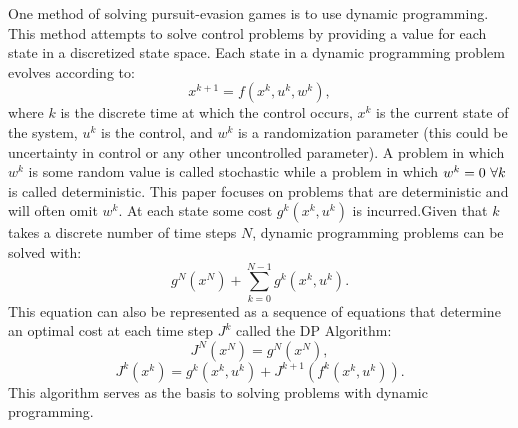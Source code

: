 One method of solving pursuit-evasion games is to use dynamic programming. This method attempts to solve control problems by providing a value for each state in a discretized state space. Each state in a dynamic programming problem evolves according to:
\begin{equation*}
x^{k+1}=f(x^k,u^k,w^k),
\end{equation*} 
where $k$ is the discrete time at which the control occurs, $x^k$ is the current state of the system, $u^k$ is the control, and $w^k$ is a randomization parameter (this could be uncertainty in control or any other uncontrolled parameter). A problem in which $w^k$ is some random value is called stochastic while a problem in which $w^k = 0 \textnormal{ } \forall k$ is called deterministic. This paper focuses on problems that are deterministic and will often omit $w^k$. At each state some cost $g^k(x^k,u^k)$ is incurred.Given that $k$ takes a discrete number of time steps $N$, dynamic programming problems can be solved with:
\begin{equation}\label{dyprog}
g^{N}(x^N)+\sum_{k=0}^{N-1}g^k(x^k,u^k).
\end{equation}
This equation can also be represented as a sequence of equations that determine an optimal cost at each time step $J^k$ called the DP Algorithm:
\begin{equation}\label{dyalg1}
J^N(x^N)= g^N(x^N),
\end{equation}
\begin{equation}\label{dyalg2}
J^k(x^k)= g^k(x^k,u^k)+J^{k+1}(f^k(x^k,u^k)).
\end{equation}
This algorithm serves as the basis to solving problems with dynamic programming.\cite{bert}

